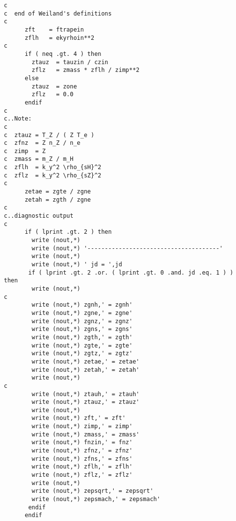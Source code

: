 \begin{verbatim}
c
c  end of Weiland's definitions
c
      zft    = ftrapein
      zflh   = ekyrhoin**2
c
      if ( neq .gt. 4 ) then
        ztauz  = tauzin / czin
        zflz   = zmass * zflh / zimp**2
      else
        ztauz  = zone
        zflz   = 0.0
      endif
c
c..Note:
c
c  ztauz = T_Z / ( Z T_e )
c  zfnz  = Z n_Z / n_e
c  zimp  = Z
c  zmass = m_Z / m_H
c  zflh  = k_y^2 \rho_{sH}^2
c  zflz  = k_y^2 \rho_{sZ}^2
c
      zetae = zgte / zgne
      zetah = zgth / zgne
c
c..diagnostic output
c
      if ( lprint .gt. 2 ) then
        write (nout,*)
        write (nout,*) '--------------------------------------'
        write (nout,*)
        write (nout,*) ' jd = ',jd
       if ( lprint .gt. 2 .or. ( lprint .gt. 0 .and. jd .eq. 1 ) ) then
        write (nout,*)
c
        write (nout,*) zgnh,' = zgnh'
        write (nout,*) zgne,' = zgne'
        write (nout,*) zgnz,' = zgnz'
        write (nout,*) zgns,' = zgns'
        write (nout,*) zgth,' = zgth'
        write (nout,*) zgte,' = zgte'
        write (nout,*) zgtz,' = zgtz'
        write (nout,*) zetae,' = zetae'
        write (nout,*) zetah,' = zetah'
        write (nout,*)
c
        write (nout,*) ztauh,' = ztauh'
        write (nout,*) ztauz,' = ztauz'
        write (nout,*)
        write (nout,*) zft,' = zft'
        write (nout,*) zimp,' = zimp'
        write (nout,*) zmass,' = zmass'
        write (nout,*) fnzin,' = fnz'
        write (nout,*) zfnz,' = zfnz'
        write (nout,*) zfns,' = zfns'
        write (nout,*) zflh,' = zflh'
        write (nout,*) zflz,' = zflz'
        write (nout,*)
        write (nout,*) zepsqrt,' = zepsqrt'
        write (nout,*) zepsmach,' = zepsmach'
       endif
      endif


\end{verbatim}
